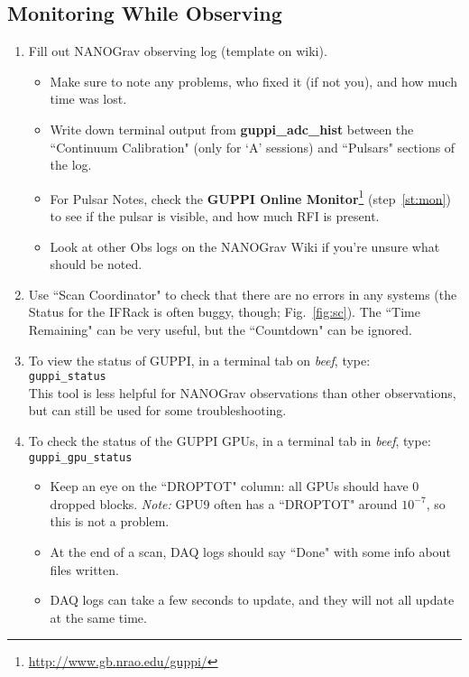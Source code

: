 \documentclass[11pt, reqno, tbtags]{article}
\begin{document}
\subsection{Monitoring While Observing} \label{ssec:mon}  %
\begin{enumerate}
 \item \label{st:log}Fill out NANOGrav observing log (template on wiki\footnotemark[1]).  \begin{itemize}
  \item Make sure to note any problems, who fixed it (if not you), and how much time was lost.
  \item Write down terminal output from \textbf{guppi\_adc\_hist} between the ``Continuum Calibration" (only for `A' sessions) and ``Pulsars" sections of the log.  
  \item For Pulsar Notes, check the \textbf{GUPPI Online Monitor}{\footnote{\url{http://www.gb.nrao.edu/guppi/}}} (step~\ref{st:mon}) to see if the pulsar is visible, and how much RFI is present.  
  \item Look at other Obs logs on the NANOGrav Wiki if you're unsure what should be noted.  \end{itemize}

 \item Use ``Scan Coordinator" to check that there are no errors in any systems (the Status for the IFRack is often buggy, though; Fig.~\ref{fig:sc}). The ``Time Remaining" can be very useful, but the ``Countdown" can be ignored. 

 \item To view the status of GUPPI, in a terminal tab on \textit{beef}, type: \\
 \texttt{guppi\_status} \\
 This tool is less helpful for NANOGrav observations than other observations, but can still be used for some troubleshooting. 

 \item To check the status of the GUPPI GPUs, in a terminal tab in \textit{beef}, type: \\
 \texttt{guppi\_gpu\_status} 
 \begin{itemize}
  \item Keep an eye on the ``DROPTOT" column: all GPUs should have 0 dropped blocks.  \textit{Note:} GPU9 often has a ``DROPTOT" around $10^{-7}$, so this is not a problem. 
  \item At the end of a scan, DAQ logs should say ``Done" with some info about files written.  
  \item DAQ logs can take a few seconds to update, and they will not all update at the same time. \end{itemize}


\end{enumerate}
\end{document}
